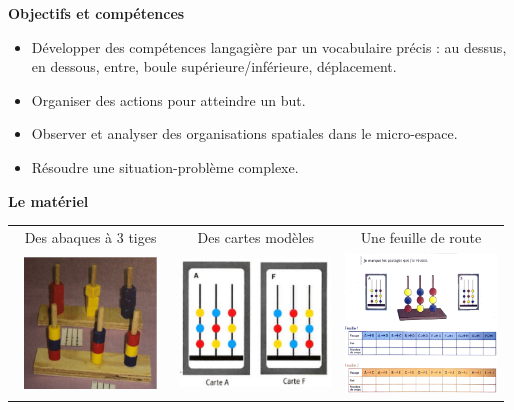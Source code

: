 \begin{exercice*} %

{\bf Objectifs et compétences}
   \begin{itemize}
      \item Développer des compétences langagière par un vocabulaire précis : au dessus, en dessous, entre, boule supérieure/inférieure, déplacement.
      \item Organiser des actions pour atteindre un but.
      \item Observer et analyser des organisations spatiales dans le micro-espace.
      \item Résoudre une situation-problème complexe. \medskip
   \end{itemize}

{\bf Le matériel}
\begin{center}
   \begin{tabular}{C{4.5}|C{4.5}|C{4.5}}
      Des abaques à 3 tiges & Des cartes modèles & Une feuille de route \\
      \includegraphics[width=4cm,height=3.5cm]{Geometrie_did/Images/Geo6_activites_abaques_taquins1}
      &
      \includegraphics[width=4cm]{Geometrie_did/Images/Geo6_activites_abaques_taquins2}
      &
      \includegraphics[width=4cm]{Geometrie_did/Images/Geo6_activites_abaques_taquins3}
      \\
   \end{tabular} \\
\end{center}


\end{exercice*}
